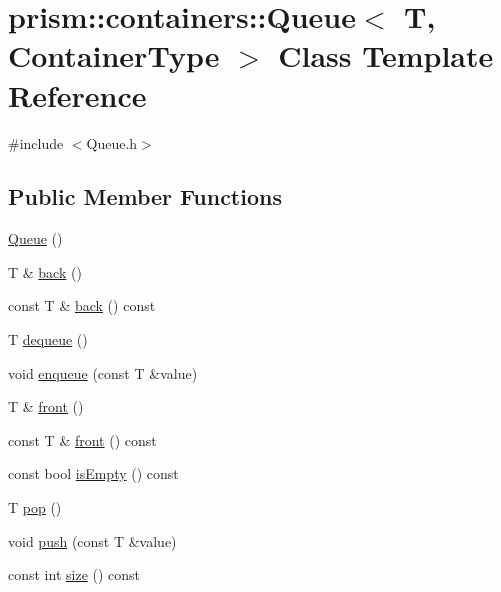 \hypertarget{classprism_1_1containers_1_1_queue}{}\section{prism\+:\+:containers\+:\+:Queue$<$ T, Container\+Type $>$ Class Template Reference}
\label{classprism_1_1containers_1_1_queue}


{\ttfamily \#include $<$Queue.\+h$>$}

\subsection*{Public Member Functions}
\begin{DoxyCompactItemize}
\item 
\hyperlink{classprism_1_1containers_1_1_queue_ac348377c8390c51d48125dc2e498f366}{Queue} ()
\item 
T \& \hyperlink{classprism_1_1containers_1_1_queue_aa37c9828a25ff8fa7dd27282b9167aad}{back} ()
\item 
const T \& \hyperlink{classprism_1_1containers_1_1_queue_aade9e9e56498bdabc1486ce6851f9766}{back} () const 
\item 
T \hyperlink{classprism_1_1containers_1_1_queue_ab03e296b078e60e13fb14aae9f659578}{dequeue} ()
\item 
void \hyperlink{classprism_1_1containers_1_1_queue_ac402c1b555ff8740d22739d43d95e840}{enqueue} (const T \&value)
\item 
T \& \hyperlink{classprism_1_1containers_1_1_queue_a6100bdc1429ccc3e0d6b94aaa16cb080}{front} ()
\item 
const T \& \hyperlink{classprism_1_1containers_1_1_queue_a6b341ec9d503fdf9b1815d2e515af8f9}{front} () const 
\item 
const bool \hyperlink{classprism_1_1containers_1_1_queue_a03c2642fd93ae3082a8fe2b69b9e7b1f}{is\+Empty} () const 
\item 
T \hyperlink{classprism_1_1containers_1_1_queue_a721a807abc3cc08a6cba3de3640a1a7d}{pop} ()
\item 
void \hyperlink{classprism_1_1containers_1_1_queue_a15cdb3cdc14f7491b6cad6f6cc62d330}{push} (const T \&value)
\item 
const int \hyperlink{classprism_1_1containers_1_1_queue_a9eb85b27bc0d969d1cd76a971ff433fc}{size} () const 
\end{DoxyCompactItemize}


